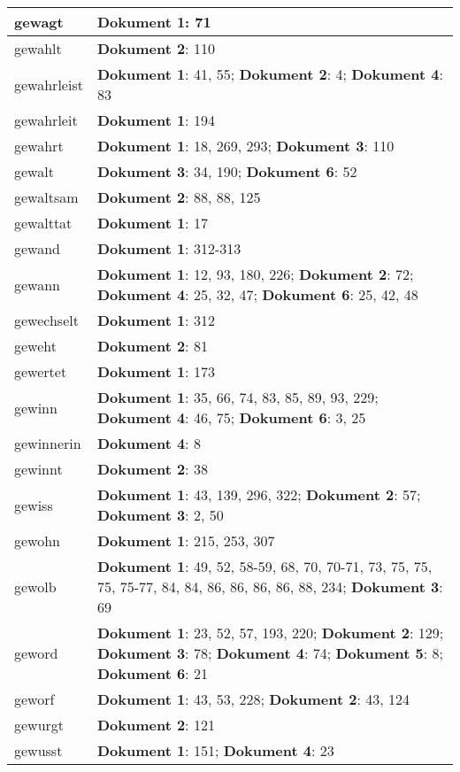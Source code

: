 \documentclass[a5paper]{article}
\begin{document}
\begin{longtable}[l]{|l|p{3in}|}
\hline
gewagt & \textbf{Dokument 1}: 71 \\
\hline
gewahlt & \textbf{Dokument 2}: 110 \\
\hline
gewahrleist & \textbf{Dokument 1}: 41, 55; \textbf{Dokument 2}: 4; \textbf{Dokument 4}: 83 \\
\hline
gewahrleit & \textbf{Dokument 1}: 194 \\
\hline
gewahrt & \textbf{Dokument 1}: 18, 269, 293; \textbf{Dokument 3}: 110 \\
\hline
gewalt & \textbf{Dokument 3}: 34, 190; \textbf{Dokument 6}: 52 \\
\hline
gewaltsam & \textbf{Dokument 2}: 88, 88, 125 \\
\hline
gewalttat & \textbf{Dokument 1}: 17 \\
\hline
gewand & \textbf{Dokument 1}: 312-313 \\
\hline
gewann & \textbf{Dokument 1}: 12, 93, 180, 226; \textbf{Dokument 2}: 72; \textbf{Dokument 4}: 25, 32, 47; \textbf{Dokument 6}: 25, 42, 48 \\
\hline
gewechselt & \textbf{Dokument 1}: 312 \\
\hline
geweht & \textbf{Dokument 2}: 81 \\
\hline
gewertet & \textbf{Dokument 1}: 173 \\
\hline
gewinn & \textbf{Dokument 1}: 35, 66, 74, 83, 85, 89, 93, 229; \textbf{Dokument 4}: 46, 75; \textbf{Dokument 6}: 3, 25 \\
\hline
gewinnerin & \textbf{Dokument 4}: 8 \\
\hline
gewinnt & \textbf{Dokument 2}: 38 \\
\hline
gewiss & \textbf{Dokument 1}: 43, 139, 296, 322; \textbf{Dokument 2}: 57; \textbf{Dokument 3}: 2, 50 \\
\hline
gewohn & \textbf{Dokument 1}: 215, 253, 307 \\
\hline
gewolb & \textbf{Dokument 1}: 49, 52, 58-59, 68, 70, 70-71, 73, 75, 75, 75, 75-77, 84, 84, 86, 86, 86, 86, 88, 234; \textbf{Dokument 3}: 69 \\
\hline
geword & \textbf{Dokument 1}: 23, 52, 57, 193, 220; \textbf{Dokument 2}: 129; \textbf{Dokument 3}: 78; \textbf{Dokument 4}: 74; \textbf{Dokument 5}: 8; \textbf{Dokument 6}: 21 \\
\hline
geworf & \textbf{Dokument 1}: 43, 53, 228; \textbf{Dokument 2}: 43, 124 \\
\hline
gewurgt & \textbf{Dokument 2}: 121 \\
\hline
gewusst & \textbf{Dokument 1}: 151; \textbf{Dokument 4}: 23 \\

\end{longtable}
\end{document}
